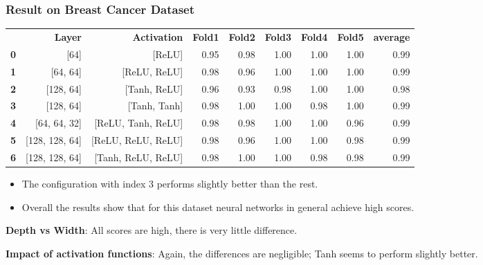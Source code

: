 \documentclass[10pt]{beamer}
\begin{document}
\begin{frame}
\frametitle{Result on Breast Cancer Dataset}
\begin{table}
\centering
\tiny
\begin{tabularx}{\textwidth}{rrrrrrrrr}
 & \textbf{Layer} & \textbf{Activation} & \textbf{Fold1} & \textbf{Fold2} & \textbf{Fold3} & \textbf{Fold4} & \textbf{Fold5} & \textbf{average} \\
\textbf{0} & [64] & [ReLU] & 0.95 & 0.98 & 1.00 & 1.00 & 1.00 & 0.99 \\
\textbf{1} & [64, 64] & [ReLU, ReLU] & 0.98 & 0.96 & 1.00 & 1.00 & 1.00 & 0.99 \\
\textbf{2} & [128, 64] & [Tanh, ReLU] & 0.96 & 0.93 & 0.98 & 1.00 & 1.00 & 0.98 \\
\textbf{3} & [128, 64] & [Tanh, Tanh] & 0.98 & 1.00 & 1.00 & 0.98 & 1.00 & 0.99 \\
\textbf{4} & [64, 64, 32] & [ReLU, Tanh, ReLU] & 0.98 & 0.98 & 1.00 & 1.00 & 0.96 & 0.99 \\
\textbf{5} & [128, 128, 64] & [ReLU, ReLU, ReLU] & 0.98 & 0.96 & 1.00 & 1.00 & 0.98 & 0.99 \\
\textbf{6} & [128, 128, 64] & [Tanh, ReLU, ReLU] & 0.98 & 1.00 & 1.00 & 0.98 & 0.98 & 0.99
\end{tabularx}
\end{table}
\scriptsize
\begin{itemize}
\item The configuration with index 3 performs slightly better than the rest.
\item Overall the results show that for this dataset neural networks in general achieve high scores.
\end{itemize}

\textbf{Depth vs Width}: All scores are high, there is very little difference.

\textbf{Impact of activation functions}: Again, the differences are negligible; Tanh seems to perform slightly better.
\end{frame}
\end{document}
